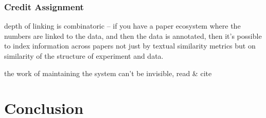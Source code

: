 \documentclass[11pt]{article}
\begin{document}
\begin{multicols}{2}
{\subsubsection{Credit Assignment}\label{credit-assignment}}

depth of linking is combinatoric -- if you have a paper ecosystem where
the numbers are linked to the data, and then the data is annotated, then
it's possible to index information across papers not just by textual
similarity metrics but on similarity of the structure of experiment and
data.

the work of maintaining the system can't be invisible, read \& cite \cite{classeDistributedInfrastructureSupport2017
bowkerInformationInfrastructureStudies2010}  
\end{multicols}


\hypertarget{conclusion}{%
\section{Conclusion}\label{conclusion}}
\end{document}
